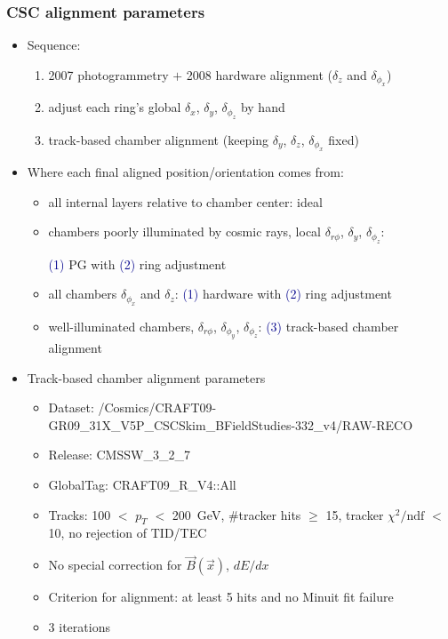 \documentclass[compress]{beamer}
\begin{document}
\begin{frame}
\frametitle{CSC alignment parameters}

\scriptsize
\vspace{-0.25 cm}
\begin{itemize}
\item \scriptsize Sequence:
\begin{enumerate}
\scriptsize \item \scriptsize 2007 photogrammetry $+$ 2008 hardware alignment ($\delta_z$ and $\delta_{\phi_x}$)
\item \scriptsize adjust each ring's global $\delta_x$, $\delta_y$, $\delta_{\phi_z}$ by hand
\item \scriptsize track-based chamber alignment (keeping $\delta_y$, $\delta_z$, $\delta_{\phi_x}$ fixed)
\end{enumerate}
\item \scriptsize Where each final aligned position/orientation comes from:
\begin{itemize}
\item \scriptsize all internal layers relative to chamber center: ideal
\item \scriptsize chambers poorly illuminated by cosmic rays, local $\delta_{r\phi}$, $\delta_y$, $\delta_{\phi_z}$:

\textcolor{darkblue}{(1)} PG with \textcolor{darkblue}{(2)} ring adjustment
\item \scriptsize all chambers $\delta_{\phi_x}$ and $\delta_z$: \textcolor{darkblue}{(1)} hardware with \textcolor{darkblue}{(2)} ring adjustment
\item \scriptsize well-illuminated chambers, $\delta_{r\phi}$, $\delta_{\phi_y}$, $\delta_{\phi_z}$: \textcolor{darkblue}{(3)} track-based chamber alignment
\end{itemize}
\item \scriptsize Track-based chamber alignment parameters
\begin{itemize}
\item \scriptsize Dataset: {\scriptsize /Cosmics/CRAFT09-GR09\_31X\_V5P\_CSCSkim\_BFieldStudies-332\_v4/RAW-RECO}
\item \scriptsize Release: CMSSW\_3\_2\_7
\item \scriptsize GlobalTag: CRAFT09\_R\_V4::All
\item \scriptsize Tracks: 100 $<$ $p_T$ $<$ 200~GeV, \#tracker hits $\ge$ 15, tracker $\chi^2/\mbox{ndf}$ $<$ 10, no rejection of TID/TEC
\item \scriptsize No special correction for $\vec{B}(\vec{x})$, $dE/dx$
\item \scriptsize Criterion for alignment: at least 5 hits and no Minuit fit failure
\item \scriptsize 3 iterations
\end{itemize}
\end{itemize}
\end{frame}
\end{document}
